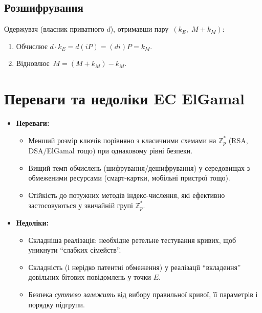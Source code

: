 \documentclass[12pt]{report}
\theoremstyle{definition}
\theoremstyle{plain}
\begin{document}
\subsection{Розшифрування}
Одержувач (власник приватного \(d\)), отримавши пару \(\,(k_E, \; M + k_M)\):
\begin{enumerate}
    \item Обчислює \(d \cdot k_E = d(iP) = (di)P = k_M\).
    \item Відновлює \(\,M = (M + k_M) - k_M\).
\end{enumerate}


\section{Переваги та недоліки EC ElGamal}

\begin{itemize}
    \item \textbf{Переваги:}   
    \begin{itemize}
        \item Менший розмір ключів порівняно з класичними схемами на \(\mathbb{Z}_p^*\) 
              (RSA, DSA/ElGamal тощо) при однаковому рівні безпеки.  
        \item Вищий темп обчислень (шифрування/дешифрування) у середовищах з 
              обмеженими ресурсами (смарт-картки, мобільні пристрої тощо).  
        \item Стійкість до потужних методів індекс-числення, які ефективно 
              застосовуються у звичайній групі \(\mathbb{Z}_p^*\).  
    \end{itemize}

    \item \textbf{Недоліки:}  
    \begin{itemize}
        \item Складніша реалізація: необхідне ретельне тестування кривих, 
              щоб уникнути ``слабких сімейств''.  
        \item Складність (і нерідко патентні обмеження) у реалізації 
              “вкладення” довільних бітових повідомлень у точки \(E\).  
        \item Безпека \textit{суттєво залежить} від вибору правильної кривої, 
              її параметрів і порядку підгрупи.  
    \end{itemize}
\end{itemize}
\end{document}
